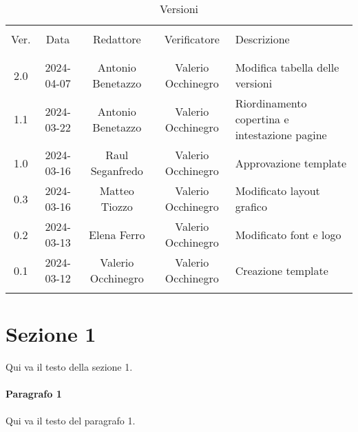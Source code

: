 \documentclass[italian,12pt]{article}
\begin{document}


\newpage



\begin{table}[!h]
	\caption{Versioni}
	\footnotesize
	\begin{center}
		\begin{tabular}{ c c c c p{6.1cm} }
			\hline                                                                                                      \\[-2ex]
			Ver. & Data       & Redattore          & Verificatore       & Descrizione                                   \\
			\\[-2ex] \hline \\[-1.5ex]
			2.0  & 2024-04-07 & Antonio Benetazzo  & Valerio Occhinegro & Modifica tabella delle versioni               \\
			1.1  & 2024-03-22 & Antonio Benetazzo  & Valerio Occhinegro & Riordinamento copertina e intestazione pagine \\
			1.0  & 2024-03-16 & Raul Seganfredo    & Valerio Occhinegro & Approvazione template                         \\
			0.3  & 2024-03-16 & Matteo Tiozzo      & Valerio Occhinegro & Modificato layout grafico                     \\
			0.2  & 2024-03-13 & Elena Ferro        & Valerio Occhinegro & Modificato font e logo                        \\
			0.1  & 2024-03-12 & Valerio Occhinegro & Valerio Occhinegro & Creazione template                            \\
			\\[-1.5ex] \hline
		\end{tabular}
	\end{center}
\end{table}

\newpage

\tableofcontents

\newpage

\section{Sezione 1}
Qui va il testo della sezione 1.

\paragraph{Paragrafo 1}
Qui va il testo del paragrafo 1.
\end{document}

